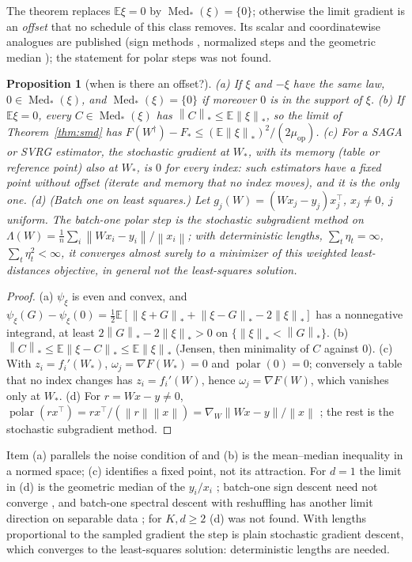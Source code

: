\documentclass[10pt]{article}
\newtheorem{proposition}[theorem]{Proposition}
\theoremstyle{remark}
\newcommand{\E}{\mathbb{E}}
\newcommand{\norm}[1]{\left\|#1\right\|}
\newcommand{\nnuc}[1]{\left\|#1\right\|_{*}}
\newcommand{\polar}{\operatorname{polar}}
\newcommand{\Med}{\operatorname{Med}_\ast}
\newcommand{\muop}{\mu_{\mathrm{op}}}
\begin{document}
The theorem replaces $\E\xi=0$ by $\Med(\xi)=\{0\}$; otherwise the limit gradient is an \emph{offset} that no schedule of
this class removes. Its scalar and coordinatewise analogues are published (sign methods \cite{chen2020distributed},
normalized steps and the geometric median \cite{cardot2013efficient}); the statement for polar steps was not found.

\begin{proposition}[when is there an offset?]\label{prop:comp}
(a) If $\xi$ and $-\xi$ have the same law, $0\in\Med(\xi)$, and $\Med(\xi)=\{0\}$ if moreover $0$ is in the support of
$\xi$. (b) If $\E\xi=0$, every $C\in\Med(\xi)$ has $\nnuc C\le\E\nnuc\xi$, so the limit of Theorem~\ref{thm:smd} has
$F(W^\dagger)-F_\ast\le(\E\nnuc\xi)^2/(2\muop)$. (c) For a SAGA or SVRG estimator, the stochastic gradient at $W_\ast$, with
its memory (table or reference point) also at $W_\ast$, is $0$ for every index: such estimators have a fixed point without
offset (iterate and memory that no index moves), and it is the only one. (d) (Batch one on least squares.) Let
$g_j(W)=(Wx_j-y_j)x_j^\top$, $x_j\ne0$, $j$ uniform. The batch-one polar step is the stochastic subgradient method on
$\Lambda(W)=\frac1n\sum_i\norm{Wx_i-y_i}/\norm{x_i}$; with deterministic lengths, $\sum_t\eta_t=\infty$,
$\sum_t\eta_t^2<\infty$, it converges almost surely to a minimizer of this weighted least-distances objective, in
general not the least-squares solution.
\end{proposition}
\begin{proof}
(a) $\psi_\xi$ is even and convex, and $\psi_\xi(G)-\psi_\xi(0)=\frac12\E[\nnuc{\xi+G}+\nnuc{\xi-G}-2\nnuc\xi]$ has a
nonnegative integrand, at least $2\nnuc G-2\nnuc\xi>0$ on $\{\nnuc\xi<\nnuc G\}$. (b) $\nnuc C\le\E\nnuc{\xi-C}\le\E\nnuc\xi$
(Jensen, then minimality of $C$ against $0$). (c) With $z_i=f_i'(W_\ast)$, $\omega_j=\nabla F(W_\ast)=0$ and
$\polar(0)=0$; conversely a table that no index changes has $z_i=f_i'(W)$, hence $\omega_j=\nabla F(W)$, which vanishes
only at $W_\ast$. (d) For $r=Wx-y\ne0$, $\polar(rx^\top)=rx^\top/(\norm r\norm x)=\nabla_W\norm{Wx-y}/\norm x$
\cite[Lemma~H.1]{li2026implicit}; the rest is the stochastic subgradient method.
\end{proof}

Item (a) parallels the noise condition of \cite{bernstein2019majority} and (b) is the mean--median inequality in a normed
space; (c) identifies a fixed point, not its attraction. For $d=1$ the limit in (d) is the geometric median of the
$y_i/x_i$ \cite{cardot2013efficient}; batch-one sign descent need not converge \cite{karimireddy2019error}, and batch-one
spectral descent with reshuffling has another limit direction on separable data \cite[Theorem~4.10]{li2026implicit};
for $K,d\ge2$ (d) was not found. With lengths proportional to the sampled gradient the step is plain stochastic
gradient descent, which converges to the least-squares solution: deterministic lengths are needed.
\end{document}
